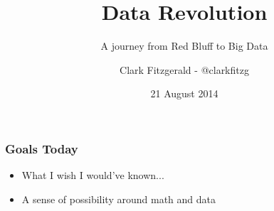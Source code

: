 \documentclass{beamer}
\begin{document}
\title{Data Revolution}
\subtitle{A journey from Red Bluff to Big Data}
\author{Clark Fitzgerald - @clarkfitzg}
\date{21 August 2014}

\frame{\titlepage}


\begin{frame}


\frametitle{Goals Today}

\begin{itemize}
\item What I wish I would've known...
\item A sense of possibility around math and data
\end{itemize}

\tableofcontents


\end{frame}
\end{document}
